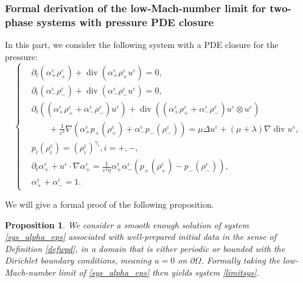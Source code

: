 \documentclass[11pt, twoside, a4paper]{article}
\theoremstyle{plain}
\newtheorem{proposition}[theorem]{Proposition}
\theoremstyle{remark}
\numberwithin{equation}{section}
\renewcommand{\div}{\operatorname{div}}
\renewcommand{\epsilon}{\varepsilon}
\newcommand{\dt}{\partial_t}
\newcommand{\eps}{\varepsilon}
\newcommand{\ap}{\alpha_+}
\newcommand{\am}{\alpha_-}
\newcommand{\rp}{\rho_+}
\newcommand{\rmi}{\rho_-}
\begin{document}
\subsubsection{Formal derivation of the low-Mach-number limit for two-phase systems with pressure PDE closure}

In this part, we consider the following system with a PDE closure for the pressure:
\begin{equation}\label{sys_alpha_eps}
    \left\{
        \begin{aligned}
            &\partial_t (\alpha_+^{\epsilon} \rho_+^{\epsilon}) + \div(\alpha_+^{\epsilon}\rho_+^{\epsilon}u^{\epsilon}) = 0,\\
            &\partial_t (\alpha_-^{\epsilon} \rho_-^{\epsilon}) + \div(\alpha_-^{\epsilon}\rho_-^{\epsilon}u^{\epsilon}) = 0,\\
            &\partial_t ((\alpha_+^{\epsilon} \rho_+^{\epsilon} + \alpha_-^{\epsilon}\rho_-^{\epsilon})u^{\epsilon}) + \div((\alpha_+^{\epsilon}\rho_+^{\epsilon} + \alpha_-^{\epsilon}\rho_-^{\epsilon})u^{\epsilon}\otimes u^{\epsilon})\\
            & \quad \quad + \frac{1}{\epsilon^2} \nabla (\alpha_+^{\epsilon}p_+(\rho_+^{\epsilon})+\alpha_-^{\epsilon}p_-(\rho_-^{\epsilon})) = \mu \Delta u^{\epsilon} + (\mu + \lambda)\nabla \div u^{\epsilon},\\
            &p_i(\rho_i^{\epsilon}) = (\rho_i^{\epsilon})^{\gamma_i}, i=+,-,\\
            &\dt \ap^\eps + u^\eps \cdot \nabla \ap^\eps = \frac{1}{\eps^2 \eta} \ap^\eps \am^\eps \left(p_+(\rp^\eps)-p_-(\rmi^\eps)\right),\\
            &\alpha_+^{\epsilon} + \alpha_-^{\epsilon} = 1.
        \end{aligned}
    \right .
\end{equation}

We will give a formal proof of the following proposition.

\begin{proposition}
We consider a smooth enough solution of system \eqref{sys_alpha_eps} associated with well-prepared initial data in the sense of Definition \eqref{defwpd}, in a domain that is either periodic or bounded with the Dirichlet boundary conditions, meaning $u = 0$ on $\partial \Omega$. Formally taking the low-Mach-number limit of \eqref{sys_alpha_eps} then yields system \eqref{limitsys}.
\end{proposition}
\end{document}
